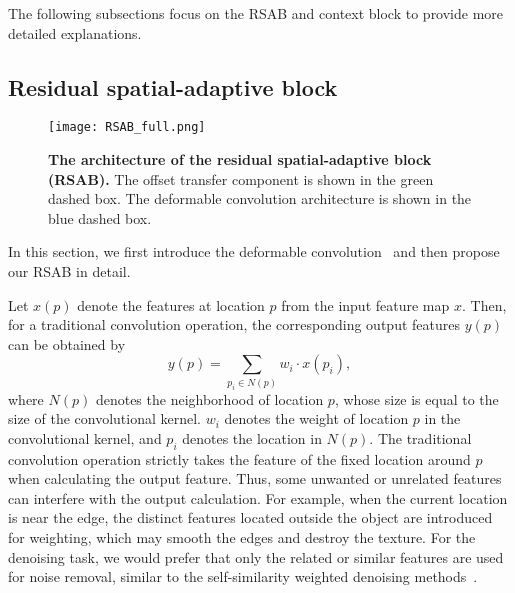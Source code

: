 \documentclass[runningheads]{llncs}
\begin{document}
The following subsections focus on the RSAB and context block to provide more detailed explanations.

\subsection{Residual spatial-adaptive block}



\begin{figure}[t]
\begin{center}
\texttt{[image: RSAB\_full.png]}
\end{center}
\setlength{\abovecaptionskip}{0.cm}
   \caption{\textbf{The architecture of the residual spatial-adaptive block (RSAB).} The offset transfer component is shown in the green dashed box. The deformable convolution architecture is shown in the blue dashed box.}
\label{fig_RSAB}
\end{figure}

In this section, we first introduce the deformable convolution~\cite{dai2017deformable,zhu2019deformable} and then propose our RSAB in detail.

Let $x(p)$ denote the features at location $p$ from the input feature map $x$. Then, for a traditional convolution operation, the corresponding output features $y(p)$ can be obtained by
\begin{equation}
    y(p)=\sum_{p_i\in N(p)} w_i \cdot x(p_i),
\end{equation}
where $N(p)$ denotes the neighborhood of location $p$, whose size is equal to the size of the convolutional kernel. $w_i$ denotes the weight of location $p$ in the convolutional kernel, and $p_i$ denotes the location in $N(p)$. The traditional convolution operation strictly takes the feature of the fixed location around $p$ when calculating the output feature. Thus, some unwanted or unrelated features can interfere with the output calculation. For example, when the current location is near the edge, the distinct features located outside the object are introduced for weighting, which may smooth the edges and destroy the texture. For the denoising task, we would prefer that only the related or similar features are used for noise removal, similar to the self-similarity weighted denoising methods~\cite{buades2005non,dabov2007color,dabov2007image}. 
\end{document}
